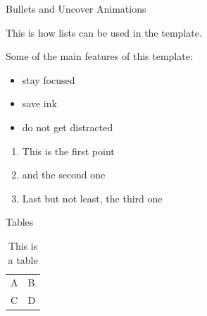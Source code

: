 \documentclass[handout]{beamer}
\begin{document}
\begin{frame}{Bullets and Uncover Animations}

This is how lists can be used in the template. \\ \vspace{1em}

Some of the main features of this template:
	
	\begin{itemize}
		\item<1-> stay focused
		\item<2-> save ink
		\item<3-> do not get distracted
	\end{itemize}

	\vspace{1em}	

	\begin{enumerate}
		\item<5-> This is the first point
		\item<6-> and the second one
		\item<7-> Last but not least, the third one
	\end{enumerate}
	
\end{frame}

\begin{frame}{Tables}
	\begin{table}
		\begin{tabular}{ll}
			A & B\\
			C & D
		\end{tabular}
		\caption{This is a table}
		\label{tbl:simpletable}
	\end{table}
\end{frame}

\end{document}
